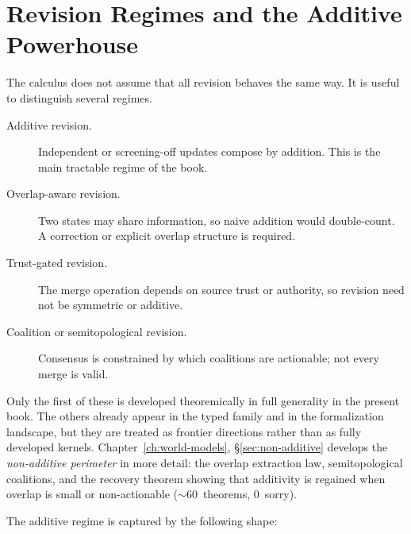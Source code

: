\documentclass[11pt,openany]{report}
\begin{document}

\section{Revision Regimes and the Additive Powerhouse}
\label{sec:overview-regimes}

The calculus does not assume that all revision behaves the same way.  It is
useful to distinguish several regimes.

\begin{description}
\item[Additive revision.]  Independent or screening-off updates compose by
  addition.  This is the main tractable regime of the book.
\item[Overlap-aware revision.]  Two states may share information, so naive
  addition would double-count.  A correction or explicit overlap structure is
  required.
\item[Trust-gated revision.]  The merge operation depends on source trust or
  authority, so revision need not be symmetric or additive.
\item[Coalition or semitopological revision.]  Consensus is constrained by
  which coalitions are actionable; not every merge is valid.
\end{description}

Only the first of these is developed theoremically in full generality in the
present book.  The others already appear in the typed family and in the
formalization landscape, but they are treated as frontier directions rather than
as fully developed kernels.  Chapter~\ref{ch:world-models},
\S\ref{sec:non-additive} develops the \emph{non-additive perimeter}
in more detail: the overlap extraction law, semitopological coalitions,
and the recovery theorem showing that additivity is regained when
overlap is small or non-actionable ($\sim$60~theorems, 0~sorry).

The additive regime is captured by the following shape:
\end{document}
